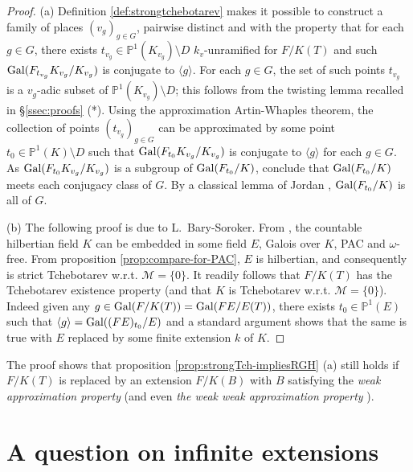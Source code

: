 \documentclass[12pt,english]{amsart}
\newtheorem{twisting lemma}[theorem]{Twisting lemma}
\begin{document}
\begin{proof} (a) Definition \ref{def:strongtchebotarev} makes it possible to construct a family of places $(v_g)_{g\in G}$, pairwise distinct and with the property that for each $g\in G$, there exists $t_{v_g}\in {\mathbb{P}}^1(K_{v_g})\setminus D$ $k_v$-unramified for $F/K(T)$ and such ${\hbox{\rm Gal}}(F_{t_{v_g}}K_{v_g}/K_{v_g})$ is conjugate to $ \langle g\rangle$. For each $g\in G$, the set of such points $t_{v_g}$ is a $v_g$-adic subset of  ${\mathbb{P}}^1(K_{v_g})\setminus D$; this follows from the twisting lemma recalled in \S \ref{ssec:proofs} (*). Using the approximation Artin-Whaples theorem, the collection of points $(t_{v_g})_{g\in G}$ can be approximated by some point $t_0\in {\mathbb{P}}^1(K)\setminus D$ such that  ${\hbox{\rm Gal}}(F_{t_0}K_{v_g}/K_{v_g})$ is conjugate to $\langle g\rangle$ for each $g\in G$. As ${\hbox{\rm Gal}}(F_{t_0}K_{v_g}/K_{v_g})$ is a subgroup of ${\hbox{\rm Gal}}(F_{t_0}/K)$, conclude that ${\hbox{\rm Gal}}(F_{t_0}/K)$ meets each conjugacy class of $G$. By a classical lemma of Jordan \cite{Jordan}, ${\hbox{\rm Gal}}(F_{t_0}/K)$ is all of $G$.
\vskip 1mm

(b) The following proof is due to L.~Bary-Soroker. From \cite[theorem 18.10.2]{FrJa}, the countable hilbertian field $K$ can be embedded in some field $E$, Galois over $K$, PAC and $\omega$-free. 
From proposition \ref{prop:compare-for-PAC}, $E$ is hilbertian, and consequently is strict 
Tchebotarev w.r.t. ${\mathcal M}=\{0\}$. It readily follows that $F/K(T)$ has the Tchebotarev existence property (and that $K$ is Tchebotarev w.r.t. ${\mathcal M}=\{0\}$). Indeed given any $g\in {\hbox{\rm Gal}}(F/K(T)) = {\hbox{\rm Gal}}(F E/E(T))$, there exists $t_0\in {\mathbb{P}}^1(E)$ such that $\langle g\rangle = {\hbox{\rm Gal}}((F E)_{t_0}/E)$ and a  standard argument shows that the same is true with $E$ replaced by some finite extension $k$ of $K$. \end{proof}

The proof shows that proposition \ref{prop:strongTch-impliesRGH} (a) still holds if $F/K(T)$ is replaced by an extension $F/K(B)$ with $B$ satisfying the {\it weak approximation property} (and even {\it the weak weak approximation property} \cite[d\'efinition 3.5.6]{Serre-topics}). 

\section{A question on infinite extensions} \label{sec:counterexamples}
\end{document}
